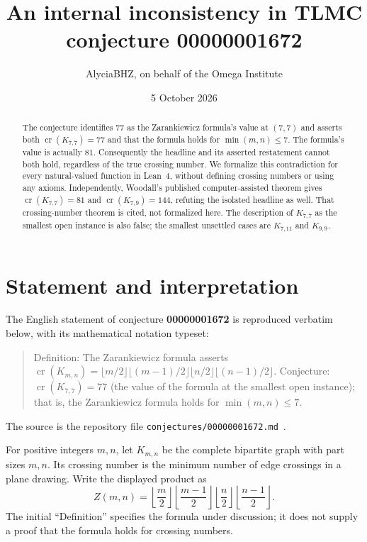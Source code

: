\documentclass[11pt]{article}
\title{An internal inconsistency in TLMC conjecture 00000001672}
\author{AlyciaBHZ, on behalf of the Omega Institute}
\date{5 October 2026}
\newcommand{\crn}{\operatorname{cr}}
\begin{document}
\maketitle

\begin{abstract}
The conjecture identifies $77$ as the Zarankiewicz formula's value at
$(7,7)$ and asserts both $\crn(K_{7,7})=77$ and that the formula holds
for $\min(m,n)\leq 7$. The formula's value is actually $81$.
Consequently the headline and its asserted restatement cannot both hold,
regardless of the true crossing number. We formalize this contradiction
for every natural-valued function in Lean~4, without defining crossing
numbers or using any axioms. Independently, Woodall's published
computer-assisted theorem gives $\crn(K_{7,7})=81$ and
$\crn(K_{7,9})=144$, refuting the isolated headline as well.
That crossing-number theorem is cited, not formalized here.
The description of $K_{7,7}$ as the smallest open instance is also false;
the smallest unsettled cases are $K_{7,11}$ and $K_{9,9}$.
\end{abstract}

\section{Statement and interpretation}
The English statement of conjecture \textbf{00000001672} is reproduced
verbatim below, with its mathematical notation typeset:
\begin{quote}
Definition: The Zarankiewicz formula asserts
$\crn(K_{m,n}) = \lfloor m/2\rfloor\allowbreak\lfloor(m-1)/2\rfloor
\allowbreak\lfloor n/2\rfloor\allowbreak\lfloor(n-1)/2\rfloor$.
Conjecture: $\crn(K_{7,7}) = 77$ (the value of the formula at the smallest
open instance); that is, the Zarankiewicz formula holds for
$\min(m,n) \leq 7$.
\end{quote}
The source is the repository file
\texttt{conjectures/00000001672.md}~\cite{tlmc}.

For positive integers $m,n$, let $K_{m,n}$ be the complete bipartite
graph with part sizes $m,n$. Its crossing number is the minimum number
of edge crossings in a plane drawing. Write the displayed product as
\[
Z(m,n)=\left\lfloor\frac m2\right\rfloor
\left\lfloor\frac{m-1}2\right\rfloor
\left\lfloor\frac n2\right\rfloor
\left\lfloor\frac{n-1}2\right\rfloor.
\]
The initial ``Definition'' specifies the formula under discussion; it
does not supply a proof that the formula holds for crossing numbers.
\end{document}

